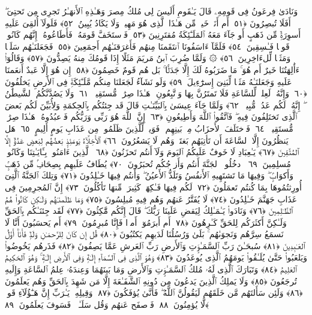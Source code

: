  وَنَادَىٰ فِرعَونُ فِى قَومِهِۦ قَالَ يَـٰقَومِ أَلَيسَ لِى مُلكُ مِصرَ وَهَـٰذِهِ ٱلأَنهَـٰرُ تَجرِى مِن تَحتِىٓ ۖ أَفَلَا تُبصِرُونَ ﴿٥١﴾
 أَم أَنَا۠ خَيرٌۭ مِّن هَـٰذَا ٱلَّذِى هُوَ مَهِينٌۭ وَلَا يَكَادُ يُبِينُ ﴿٥٢﴾
 فَلَولَآ أُلقِىَ عَلَيهِ أَسوِرَةٌۭ مِّن ذَهَبٍ أَو جَآءَ مَعَهُ ٱلمَلَـٰٓئِكَةُ مُقتَرِنِينَ ﴿٥٣﴾
 فَٱستَخَفَّ قَومَهُۥ فَأَطَاعُوهُ ۚ إِنَّهُم كَانُوا۟ قَومًۭا فَـٰسِقِينَ ﴿٥٤﴾
 فَلَمَّآ ءَاسَفُونَا ٱنتَقَمنَا مِنهُم فَأَغرَقنَـٰهُم أَجمَعِينَ ﴿٥٥﴾
 فَجَعَلنَـٰهُم سَلَفًۭا وَمَثَلًۭا لِّلءَاخِرِينَ ﴿٥٦﴾
 ۞ وَلَمَّا ضُرِبَ ٱبنُ مَريَمَ مَثَلًا إِذَا قَومُكَ مِنهُ يَصِدُّونَ ﴿٥٧﴾
 وَقَالُوٓا۟ ءَأَٰلِهَتُنَا خَيرٌ أَم هُوَ ۚ مَا ضَرَبُوهُ لَكَ إِلَّا جَدَلًۢا ۚ بَل هُم قَومٌ خَصِمُونَ ﴿٥٨﴾
 إِن هُوَ إِلَّا عَبدٌ أَنعَمنَا عَلَيهِ وَجَعَلنَـٰهُ مَثَلًۭا لِّبَنِىٓ إِسرَٰٓءِيلَ ﴿٥٩﴾
 وَلَو نَشَآءُ لَجَعَلنَا مِنكُم مَّلَـٰٓئِكَةًۭ فِى ٱلأَرضِ يَخلُفُونَ ﴿٦٠﴾
 وَإِنَّهُۥ لَعِلمٌۭ لِّلسَّاعَةِ فَلَا تَمتَرُنَّ بِهَا وَٱتَّبِعُونِ ۚ هَـٰذَا صِرَٰطٌۭ مُّستَقِيمٌۭ ﴿٦١﴾
 وَلَا يَصُدَّنَّكُمُ ٱلشَّيطَٰنُ ۖ إِنَّهُۥ لَكُم عَدُوٌّۭ مُّبِينٌۭ ﴿٦٢﴾
 وَلَمَّا جَآءَ عِيسَىٰ بِٱلبَيِّنَـٰتِ قَالَ قَد جِئتُكُم بِٱلحِكمَةِ وَلِأُبَيِّنَ لَكُم بَعضَ ٱلَّذِى تَختَلِفُونَ فِيهِ ۖ فَٱتَّقُوا۟ ٱللَّهَ وَأَطِيعُونِ ﴿٦٣﴾
 إِنَّ ٱللَّهَ هُوَ رَبِّى وَرَبُّكُم فَٱعبُدُوهُ ۚ هَـٰذَا صِرَٰطٌۭ مُّستَقِيمٌۭ ﴿٦٤﴾
 فَٱختَلَفَ ٱلأَحزَابُ مِنۢ بَينِهِم ۖ فَوَيلٌۭ لِّلَّذِينَ ظَلَمُوا۟ مِن عَذَابِ يَومٍ أَلِيمٍ ﴿٦٥﴾
 هَل يَنظُرُونَ إِلَّا ٱلسَّاعَةَ أَن تَأتِيَهُم بَغتَةًۭ وَهُم لَا يَشعُرُونَ ﴿٦٦﴾
 ٱلأَخِلَّآءُ يَومَئِذٍۭ بَعضُهُم لِبَعضٍ عَدُوٌّ إِلَّا ٱلمُتَّقِينَ ﴿٦٧﴾
 يَـٰعِبَادِ لَا خَوفٌ عَلَيكُمُ ٱليَومَ وَلَآ أَنتُم تَحزَنُونَ ﴿٦٨﴾
 ٱلَّذِينَ ءَامَنُوا۟ بِـَٔايَـٰتِنَا وَكَانُوا۟ مُسلِمِينَ ﴿٦٩﴾
 ٱدخُلُوا۟ ٱلجَنَّةَ أَنتُم وَأَزوَٟجُكُم تُحبَرُونَ ﴿٧٠﴾
 يُطَافُ عَلَيهِم بِصِحَافٍۢ مِّن ذَهَبٍۢ وَأَكوَابٍۢ ۖ وَفِيهَا مَا تَشتَهِيهِ ٱلأَنفُسُ وَتَلَذُّ ٱلأَعيُنُ ۖ وَأَنتُم فِيهَا خَـٰلِدُونَ ﴿٧١﴾
 وَتِلكَ ٱلجَنَّةُ ٱلَّتِىٓ أُورِثتُمُوهَا بِمَا كُنتُم تَعمَلُونَ ﴿٧٢﴾
 لَكُم فِيهَا فَـٰكِهَةٌۭ كَثِيرَةٌۭ مِّنهَا تَأكُلُونَ ﴿٧٣﴾
 إِنَّ ٱلمُجرِمِينَ فِى عَذَابِ جَهَنَّمَ خَـٰلِدُونَ ﴿٧٤﴾
 لَا يُفَتَّرُ عَنهُم وَهُم فِيهِ مُبلِسُونَ ﴿٧٥﴾
 وَمَا ظَلَمنَـٰهُم وَلَـٰكِن كَانُوا۟ هُمُ ٱلظَّـٰلِمِينَ ﴿٧٦﴾
 وَنَادَوا۟ يَـٰمَـٰلِكُ لِيَقضِ عَلَينَا رَبُّكَ ۖ قَالَ إِنَّكُم مَّٰكِثُونَ ﴿٧٧﴾
 لَقَد جِئنَـٰكُم بِٱلحَقِّ وَلَـٰكِنَّ أَكثَرَكُم لِلحَقِّ كَـٰرِهُونَ ﴿٧٨﴾
 أَم أَبرَمُوٓا۟ أَمرًۭا فَإِنَّا مُبرِمُونَ ﴿٧٩﴾
 أَم يَحسَبُونَ أَنَّا لَا نَسمَعُ سِرَّهُم وَنَجوَىٰهُم ۚ بَلَىٰ وَرُسُلُنَا لَدَيهِم يَكتُبُونَ ﴿٨٠﴾
 قُل إِن كَانَ لِلرَّحمَـٰنِ وَلَدٌۭ فَأَنَا۠ أَوَّلُ ٱلعَـٰبِدِينَ ﴿٨١﴾
 سُبحَـٰنَ رَبِّ ٱلسَّمَـٰوَٟتِ وَٱلأَرضِ رَبِّ ٱلعَرشِ عَمَّا يَصِفُونَ ﴿٨٢﴾
 فَذَرهُم يَخُوضُوا۟ وَيَلعَبُوا۟ حَتَّىٰ يُلَـٰقُوا۟ يَومَهُمُ ٱلَّذِى يُوعَدُونَ ﴿٨٣﴾
 وَهُوَ ٱلَّذِى فِى ٱلسَّمَآءِ إِلَـٰهٌۭ وَفِى ٱلأَرضِ إِلَـٰهٌۭ ۚ وَهُوَ ٱلحَكِيمُ ٱلعَلِيمُ ﴿٨٤﴾
 وَتَبَارَكَ ٱلَّذِى لَهُۥ مُلكُ ٱلسَّمَـٰوَٟتِ وَٱلأَرضِ وَمَا بَينَهُمَا وَعِندَهُۥ عِلمُ ٱلسَّاعَةِ وَإِلَيهِ تُرجَعُونَ ﴿٨٥﴾
 وَلَا يَملِكُ ٱلَّذِينَ يَدعُونَ مِن دُونِهِ ٱلشَّفَـٰعَةَ إِلَّا مَن شَهِدَ بِٱلحَقِّ وَهُم يَعلَمُونَ ﴿٨٦﴾
 وَلَئِن سَأَلتَهُم مَّن خَلَقَهُم لَيَقُولُنَّ ٱللَّهُ ۖ فَأَنَّىٰ يُؤفَكُونَ ﴿٨٧﴾
 وَقِيلِهِۦ يَـٰرَبِّ إِنَّ هَـٰٓؤُلَآءِ قَومٌۭ لَّا يُؤمِنُونَ ﴿٨٨﴾
 فَٱصفَح عَنهُم وَقُل سَلَـٰمٌۭ ۚ فَسَوفَ يَعلَمُونَ ﴿٨٩﴾
 
